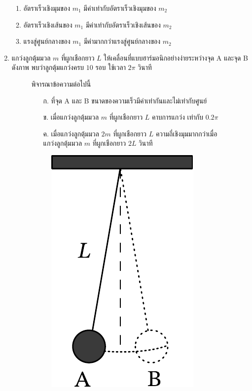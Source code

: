 \documentclass[a4paper, 12pt]{article}
\begin{document}
\begin{enumerate}
\begin{enumerate}
              \item อัตราเร็วเชิงมุมของ \(m_1\) มีค่าเท่ากับอัตราเร็วเชิงมุมของ \(m_2\)
              \item อัตราเร็วเชิงเส้นของ \(m_1\) มีค่าเท่ากับอัตราเร็วเชิงเส้นของ \(m_2\)
              \item แรงสู่ศูนย์กลางของ \(m_1\) มีค่ามากกว่าแรงสู่ศูนย์กลางของ \(m_2\)
          \end{enumerate}
          \newpage
    \item แกว่งลูกตุ้มมวล \(m\) ที่ผูกเชือกยาว \(L\) ให้เคลื่อนที่แบบฮาร์มอนิกอย่างง่ายระหว่างจุด A และจุด B ดังภาพ พบว่าลูกตุ้มแกว่งครบ \(10\) รอบ ใช้เวลา \(2\pi\) วินาที
          \begin{figure}[H]
              \begin{minipage}[ht]{0.75\linewidth}
                  พิจารณาข้อความต่อไปนี้
                  \begin{itemize}
                      \item[ก.] ที่จุด A และ B ขนาดของความเร็วมีค่าเท่ากันและไม่เท่ากับศูนย์
                      \item[ข.] เมื่อแกว่งลูกตุ้มมวล \(m\) ที่ผูกเชือกยาว \(L\) คาบการแกว่ง เท่ากับ \(0.2\pi\)
                      \item[ค.] เมื่อแกว่งลูกตุ้มมวล \(2m\) ที่ผูกเชือกยาว \(L\) ความถี่เชิงมุมมากกว่าเมื่อแกว่งลูกตุ้มมวล \(m\) ที่ผูกเชือกยาว \(2L\) วินาที
                  \end{itemize}
              \end{minipage}
              \begin{minipage}[ht]{0.2\linewidth}
                  \begin{figure}[H]
                      \raggedleft
                      \includegraphics[scale = 0.6]{images/4_4.pdf}

\end{figure}
\end{minipage}
\end{figure}
\end{enumerate}
\end{document}
